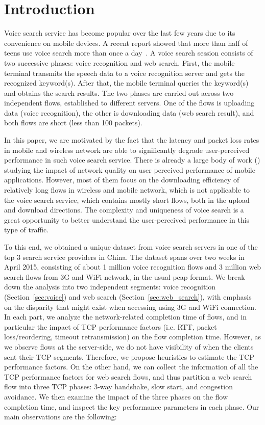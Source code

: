 
\section{Introduction}
\label{sec:intro}

Voice search service has become popular over the last few years due to its convenience on mobile devices. A recent report showed that more than half of teens use voice search more than once a day~\cite{voice_search_report}. A voice search session consists of two successive phases: voice recognition and web search. First, the mobile terminal transmits the speech data to a voice recognition server and gets the recognized keyword(s). After that, the mobile terminal queries the keyword(s) and obtains the search results. The two phases are carried out across two independent flows, established to different servers. One of the flows is uploading data (voice recognition), the other is downloading data (web search result), and both flows are short (less than 100 packets).

In this paper, we are motivated by the fact that the latency and packet loss rates in mobile and wireless network are able to significantly degrade user-perceived performance in such voice search service. There is already a large body of work (\eg \cite{sommers2012cell,yu2014can,chen2012network}) studying the impact of network quality on user perceived performance of mobile applications. However, most of them focus on the downloading efficiency of relatively long flows in wireless and mobile network, which is not applicable to the voice search service, which contains mostly short flows, both in the upload and download directions. The complexity and uniqueness of voice search is a great opportunity to better understand the user-perceived performance in this type of traffic.

To this end, we obtained a unique dataset from voice search servers in one of the top 3 search service providers in China. The dataset spans over two weeks in April 2015, consisting of about 1 million voice recognition flows and 3 million web search flows from 3G and WiFi network, in the usual pcap format. We break down the analysis into two independent segments: voice recognition (Section~\ref{sec:voice}) and web search (Section~\ref{sec:web_search}), with emphasis on the disparity that might exist when accessing using 3G and WiFi connection. In each part, we analyze the network-related completion time of flows, and in particular the impact of TCP performance factors (i.e. RTT, packet loss/reordering, timeout retransmission) on the flow completion time. However, as we observe flows at the server-side, we do not have visibility of when the clients sent their TCP segments. Therefore, we propose heuristics to estimate the TCP performance factors. On the other hand, we can collect the information of all the TCP performance factors for web search flows, and thus partition a web search flow into three TCP phases: 3-way handshake, slow start, and congestion avoidance. We then examine the impact of the three phases on the flow completion time, and inspect the key performance parameters in each phase. Our main observations are the following:

